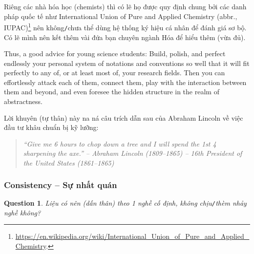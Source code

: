 \documentclass[12pt]{article}
\newtheorem{question}{Question}
\begin{document}
Riêng các nhà hóa học (chemists) thì có lẽ họ được quy định chung bởi các danh pháp quốc tế như International Union of Pure and Applied Chemistry (abbr., IUPAC)\footnote{\url{https://en.wikipedia.org/wiki/International_Union_of_Pure_and_Applied_Chemistry}.} nên không{\tt/}chưa thể dùng hệ thống ký hiệu cá nhân để đánh giá sơ bộ. Có lẽ mình nên kết thêm vài đứa bạn chuyên ngành Hóa để hiểu thêm (vừa đủ).

Thus, a good advice for young science students: Build, polish, and perfect endlessly your personal system of notations and conventions so well that it will fit perfectly to any of, or at least most of, your research fields. Then you can effortlessly attack each of them, connect them, play with the interaction between them and beyond, and even foresee the hidden structure in the realm of abstractness.

Lời khuyên (tự thân) này na ná câu trích dẫn sau của Abraham Lincoln về việc đầu tư khâu chuẩn bị kỹ lưỡng:
\begin{quote}\it
	``Give me 6 hours to chop down a tree and I will spend the 1st 4 sharpening the axe.'' -- {\sc Abraham Lincoln} (1809--1865) -- 16th President of the United States (1861--1865)
\end{quote}

\subsubsection{Consistency -- Sự nhất quán}

\begin{question}
	Liệu có nên (dấn thân) theo 1 nghề cố định, không chịu{\tt/}thèm nhảy nghề không? 
\end{question}
\end{document}
